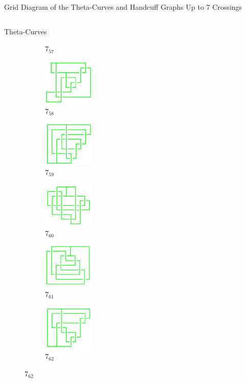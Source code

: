 \documentclass[final]{beamer}
\begin{document}
\begin{frame}[t]
\begin{alertblock}{Grid Diagram of the Theta-Curves and Handcuff Graphs Up to 7 Crossings}
\begin{columns}[t]
\begin{column}{0.6\textwidth}
\begin{alertblock}{Theta-Curves}
\begin{figure}
\begin{subfigure}{0.075\textwidth}
    \caption{$7_{57}$} 
    \end{subfigure}
    \begin{subfigure}{0.075\textwidth}
    \includegraphics[width=2.4cm]{../Midterm_Poster/grid_diagram/theta_7_58.png}
    \caption{$7_{58}$} 
    \end{subfigure}
    \begin{subfigure}{0.075\textwidth}
    \includegraphics[width=2.4cm]{../Midterm_Poster/grid_diagram/theta_7_59.png}
    \caption{$7_{59}$} 
    \end{subfigure}
    \begin{subfigure}{0.075\textwidth}
    \includegraphics[width=2.4cm]{../Midterm_Poster/grid_diagram/theta_7_60.png}
    \caption{$7_{60}$} 
    \end{subfigure}
    \begin{subfigure}{0.075\textwidth}
    \includegraphics[width=2.4cm]{../Midterm_Poster/grid_diagram/theta_7_61.png}
    \caption{$7_{61}$} 
    \end{subfigure}
    \begin{subfigure}{0.075\textwidth}
    \includegraphics[width=2.4cm]{../Midterm_Poster/grid_diagram/theta_7_62.png}
    \caption{$7_{62}$} 
    \end{subfigure}

\end{figure}
\end{alertblock}
\end{column}
\end{columns}
\end{alertblock}
\end{frame}
\end{document}
